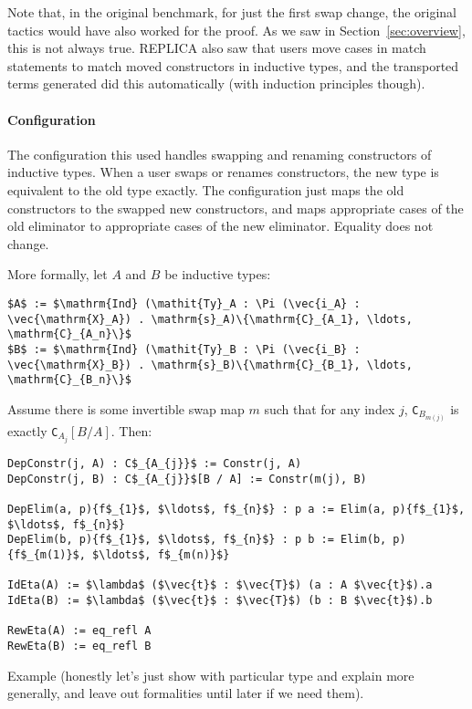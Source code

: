 Note that, in the original benchmark, for just the first swap change,
the original tactics would have also worked for the proof. 
As we saw in Section~\ref{sec:overview}, this is not always true.
REPLICA also saw that users move cases in match statements to match moved constructors
in inductive types, and the transported terms \toolname generated did this automatically
(with induction principles though).

\paragraph{Configuration}
The configuration this used handles swapping and renaming constructors of inductive types.
When a user swaps or renames constructors, the new type is equivalent to the old type exactly.
The configuration just maps the old constructors to the swapped new constructors, and maps appropriate
cases of the old eliminator to appropriate cases of the new eliminator.
Equality does not change.

More formally, let $A$ and $B$ be inductive types:

\begin{lstlisting}
$A$ := $\mathrm{Ind} (\mathit{Ty}_A : \Pi (\vec{i_A} : \vec{\mathrm{X}_A}) . \mathrm{s}_A)\{\mathrm{C}_{A_1}, \ldots, \mathrm{C}_{A_n}\}$
$B$ := $\mathrm{Ind} (\mathit{Ty}_B : \Pi (\vec{i_B} : \vec{\mathrm{X}_B}) . \mathrm{s}_B)\{\mathrm{C}_{B_1}, \ldots, \mathrm{C}_{B_n}\}$
\end{lstlisting}		
Assume there is some invertible swap map $m$ such that for any index $j$,
\lstinline{C}$_{B_{m(j)}}$ is exactly \lstinline{C}$_{A_j}[B / A]$.
Then:

\begin{lstlisting}
DepConstr(j, A) : C$_{A_{j}}$ := Constr(j, A) 
DepConstr(j, B) : C$_{A_{j}}$[B / A] := Constr(m(j), B)

DepElim(a, p){f$_{1}$, $\ldots$, f$_{n}$} : p a := Elim(a, p){f$_{1}$, $\ldots$, f$_{n}$}
DepElim(b, p){f$_{1}$, $\ldots$, f$_{n}$} : p b := Elim(b, p){f$_{m(1)}$, $\ldots$, f$_{m(n)}$}

IdEta(A) := $\lambda$ ($\vec{t}$ : $\vec{T}$) (a : A $\vec{t}$).a
IdEta(B) := $\lambda$ ($\vec{t}$ : $\vec{T}$) (b : B $\vec{t}$).b

RewEta(A) := eq_refl A
RewEta(B) := eq_refl B
\end{lstlisting}

Example (honestly let's just show with particular type and explain more generally, and leave out formalities until later if we need them).

